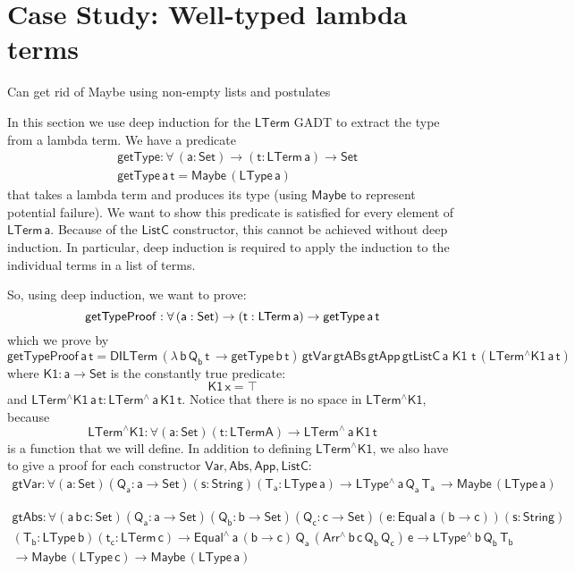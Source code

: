 \documentclass[9pt]{entcs}
\begin{document}
\section{Case Study: Well-typed lambda terms}\label{sec:app}

{\color{red} Can get rid of Maybe using non-empty lists and postulates}

In this section we use deep induction for the $\mathsf{LTerm}$ GADT to 
extract the type from a lambda term. 
We have a predicate 
\begin{align*}
  &\mathsf{getType : \forall \, (a : Set) \to (t : LTerm\,a) \to Set} \\
  &\mathsf{getType \,a \,t = Maybe \, (LType \, a)}
\end{align*}
that takes a lambda term and produces its type (using $\mathsf{Maybe}$ to represent
potential failure).
We want to show this predicate is satisfied for every element of $\mathsf{LTerm\,a}$.
Because of the $\mathsf{ListC}$ constructor, this cannot be achieved without 
deep induction. In particular, deep induction is required to apply the induction to the 
individual terms in a list of terms. 

So, using deep induction, we want to prove: 
\[
  \mathsf{getTypeProof : \forall \, (a : Set) \to (t : LTerm\,a) \to getType \,a \,t} \\
\]
which we prove by 
\[
  \mathsf{getTypeProof \,a \,t = 
    DILTerm\, (\lambda \, b\, Q_b\, t\, \to getType \,b\, t) \,
    gtVar\,  gtABs\,  gtApp\,  gtListC\,  a\,\, K1\,\, t\, (LTerm^{\wedge}K1\, a\, t)
    }
\]
where $\mathsf{K1 : a \to Set}$ is the constantly true predicate:
\[
  \mathsf{K1 \, x = \top}
\]
and $\mathsf{LTerm^{\wedge}K1\, a\, t : LTerm^{\wedge}\, a\, K1\, t}$.
Notice that there is no space in $\mathsf{LTerm^{\wedge}K1}$, because
\[
  \mathsf{LTerm^{\wedge}K1 : \forall (a : Set) (t : LTerm A) \to LTerm^{\wedge}\, a\, K1\,t}
\]
is a function that we will define. In addition to defining $\mathsf{LTerm^{\wedge}K1}$,
we also have to give a proof for each constructor $\mathsf{Var, Abs, App, ListC}$:
\begin{multline*}
  \mathsf{gtVar : \forall (a : Set) (Q_a : a \to Set) (s : String) (T_a : LType\, a) 
      \to LType^{\wedge} \, a\, Q_a\, T_a\, \to Maybe\, (LType\, a)}
\end{multline*}

\begin{multline*}
    \mathsf{gtAbs : \forall (a \, b\, c: Set) (Q_a : a \to Set) (Q_b : b \to Set) (Q_c : c \to Set) 
      (e : Equal\, a\, (b \to c)) (s : String)} \\ 
    \mathsf{ (T_b : LType\, b) (t_c : LTerm \, c)
      \to Equal^{\wedge}\, a\, (b \to c)\, Q_a\, (Arr^{\wedge}\, b\, c\, Q_b\, Q_c)\, e
      \to LType^{\wedge} \, b\, Q_b\, T_b} \\ 
    \mathsf{
      \to Maybe\, (LType\,c) \to Maybe\, (LType\, a)}
\end{multline*}
\end{document}
